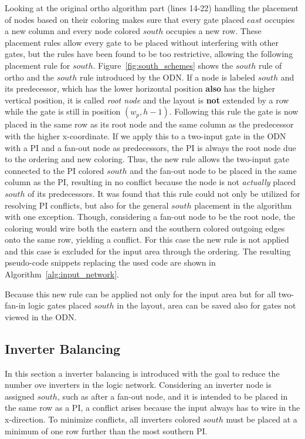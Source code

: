 Looking at the original ortho algorithm part (lines 14-22) handling the placement of nodes based on their coloring makes sure that every gate placed $east$ occupies a new column and every node colored $south$ occupies a new row. These placement rules allow every gate to be placed without interfering with other gates, but the rules have been found to be too restrictive, allowing the following placement rule for $south$. Figure~\ref{fig:south_schemes} shows the $south$ rule of ortho and the $south$ rule introduced by the ODN. If a node is labeled $south$ and its predecessor, which has the lower horizontal position \textbf{also} has the higher vertical position, it is called \emph{root node} and the layout is \textbf{not} extended by a row while the gate is still in position $(w_p, h-1)$. Following this rule the gate is now placed in the same row as its root node and the same column as the predecessor with the higher x-coordinate. If we apply this to a two-input gate in the ODN with a PI and a fan-out node as predecessors, the PI is always the root node due to the ordering and new coloring. Thus, the new rule allows the two-input gate connected to the PI colored $south$ and the fan-out node to be placed in the same column as the PI, resulting in no conflict because the node is not \textit{actually} placed $south$ of its predecessors. It was found that this rule could not only be utilized for resolving PI conflicts, but also for the general $south$ placement in the algorithm with one exception. Though, considering a fan-out node to be the root node, the coloring would wire both the eastern and the southern colored outgoing edges onto the same row, yielding a conflict. For this case the new rule is not applied and this case is excluded for the input area through the ordering. The resulting pseudo-code snippets replacing the used code are shown in Algorithm~\ref{alg:input_network}.

Because this new rule can be applied not only for the input area but for all two-fan-in logic gates placed $south$ in the layout, area can be saved also for gates not viewed in the ODN.

\subsection{Inverter Balancing}

In this section a inverter balancing is introduced with the goal to reduce the number ove inverters in the logic network. Considering an inverter node is assigned $south$, such as after a fan-out node, and it is intended to be placed in the same row as a PI, a conflict arises because the input always has to wire in the x-direction. To minimize conflicts, all inverters colored $south$ must be placed at a minimum of one row further than the most southern PI.


